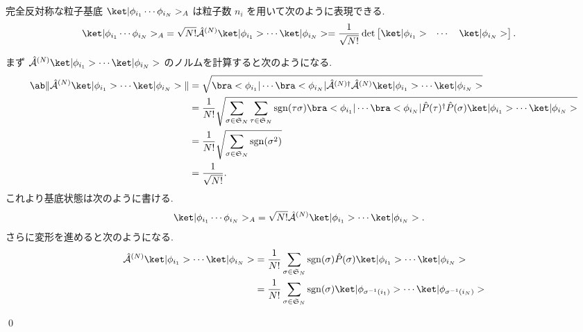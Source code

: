 \documentclass[uplatex,dvipdfmx,a4paper,11pt]{jlreq}
\makeatletter
\DeclareMathOperator{\sgn}{sgn}
\DeclareMathOperator{\Det}{det}
\renewcommand{\SS}{\mathfrak{S}}
\newcommand{\A}{\mathcal{A}}
\numberwithin{equation}{section}
\theoremstyle{definition}
\renewenvironment{proof}[1][\proofname]{\par
  \normalfont
  \topsep6\p@\@plus6\p@ \trivlist
  \item[\hskip\labelsep{\bfseries #1}\@addpunct{\bfseries}]\ignorespaces\quad\par
}{
  \qed\endtrivlist\@endpefalse
}
\renewcommand\proofname{証明}
\makeatother
\begin{document}
\begin{theorem}[Q21-19(ii), Q21-21(i)(ii)]
  完全反対称な粒子基底 $\ket|\phi_{i_1}\cdots\phi_{i_N}>_A$ は粒子数 $n_i$ を用いて次のように表現できる.
  \begin{align}
    \ket|\phi_{i_1}\cdots\phi_{i_N}>_A & = \sqrt{N!}\hat{\A}^{(N)}\ket|\phi_{i_1}>\cdots\ket|\phi_{i_N}> = \frac{1}{\sqrt{N!}}\Det\begin{bmatrix}\ket|\phi_{i_1}> & \cdots & \ket|\phi_{i_N}>\end{bmatrix}.
  \end{align}
\end{theorem}
\begin{proof}
  まず $\hat{\A}^{(N)}\ket|\phi_{i_1}>\cdots\ket|\phi_{i_N}>$ のノルムを計算すると次のようになる.
  \begin{align}
    \ab\|\hat{\A}^{(N)}\ket|\phi_{i_1}>\cdots\ket|\phi_{i_N}>\| & = \sqrt{\bra<\phi_{i_1}|\cdots\bra<\phi_{i_N}|\hat{\A}^{(N)\dagger}\hat{\A}^{(N)}\ket|\phi_{i_1}>\cdots\ket|\phi_{i_N}>}                                                                      \\
                                                                & = \frac{1}{N!}\sqrt{\sum_{\sigma\in\SS_N}\sum_{\tau\in\SS_N}\sgn(\tau\sigma)\bra<\phi_{i_1}|\cdots\bra<\phi_{i_N}|\hat{P}(\tau)^\dagger\hat{P}(\sigma)\ket|\phi_{i_1}>\cdots\ket|\phi_{i_N}>} \\
                                                                & = \frac{1}{N!}\sqrt{\sum_{\sigma\in\SS_N}\sgn(\sigma^2)}                                                                                                                                      \\
                                                                & = \frac{1}{\sqrt{N!}}.
  \end{align}
  これより基底状態は次のように書ける.
  \begin{align}
    \ket|\phi_{i_1}\cdots\phi_{i_N}>_A & = \sqrt{N!}\hat{\A}^{(N)}\ket|\phi_{i_1}>\cdots\ket|\phi_{i_N}>.
  \end{align}
  さらに変形を進めると次のようになる.
  \begin{align}
    \hat{\A}^{(N)}\ket|\phi_{i_1}>\cdots\ket|\phi_{i_N}> & = \frac{1}{N!}\sum_{\sigma\in\SS_N}\sgn(\sigma)\hat{P}(\sigma)\ket|\phi_{i_1}>\cdots\ket|\phi_{i_N}>            \\
                                                         & = \frac{1}{N!}\sum_{\sigma\in\SS_N}\sgn(\sigma)\ket|\phi_{\sigma^{-1}(i_1)}>\cdots\ket|\phi_{\sigma^{-1}(i_N)}> \\

\end{align}
\end{proof}
\end{document}
